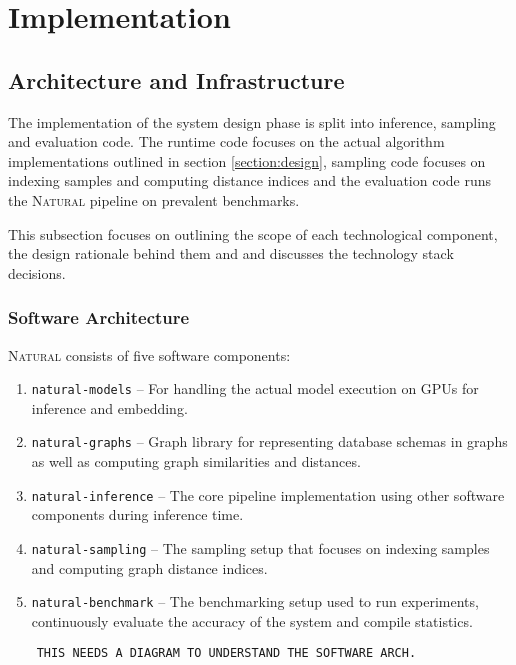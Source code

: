 \section{Implementation}


\subsection{Architecture and Infrastructure}

The implementation of the system design phase is split into inference, sampling
and evaluation code. The runtime code focuses on the actual algorithm
implementations outlined in section \ref{section:design}, sampling code focuses on
indexing samples and computing distance indices and the evaluation code runs
the \textsc{Natural} pipeline on prevalent benchmarks.

This subsection focuses on outlining the scope of each technological component,
the design rationale behind them and and discusses the technology stack
decisions.

\subsubsection{Software Architecture}

\textsc{Natural} consists of five software components:

\begin{enumerate}
    \item \texttt{natural-models} – For handling the actual model
        execution on GPUs for inference and embedding.
    \item \texttt{natural-graphs} – Graph library for representing
        database schemas in graphs as well as computing graph similarities and
        distances.
    \item \texttt{natural-inference} – The core pipeline implementation using
        other software components during inference time.
    \item \texttt{natural-sampling} – The sampling setup that focuses on
        indexing samples and computing graph distance indices.
    \item \texttt{natural-benchmark} – The benchmarking setup used to run
        experiments, continuously evaluate the accuracy of the system and
        compile statistics.
\end{enumerate}

\begin{verbatim}
    THIS NEEDS A DIAGRAM TO UNDERSTAND THE SOFTWARE ARCH.
\end{verbatim}

